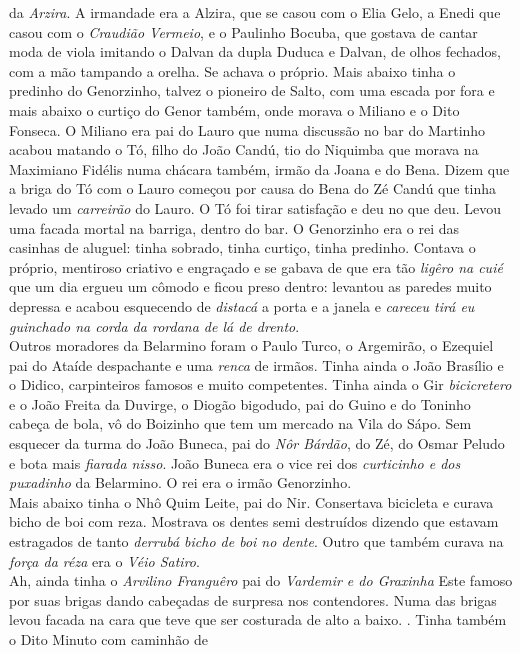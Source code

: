 \documentclass[12pt,brazil,]{book}
\begin{document}
da \emph{Arzira}. A irmandade era a Alzira, que se casou com o Elia
Gelo, a Enedi que casou com o \emph{Craudião Vermeio}, e o Paulinho
Bocuba, que gostava de cantar moda de viola imitando o Dalvan da dupla
Duduca e Dalvan, de olhos fechados, com a mão tampando a orelha. Se
achava o próprio. Mais abaixo tinha o predinho do Genorzinho, talvez o
pioneiro de Salto, com uma escada por fora e mais abaixo o curtiço do
Genor também, onde morava o Miliano e o Dito Fonseca. O Miliano era pai
do Lauro que numa discussão no bar do Martinho acabou matando o Tó,
filho do João Candú, tio do Niquimba que morava na Maximiano Fidélis
numa chácara também, irmão da Joana e do Bena. Dizem que a briga do Tó
com o Lauro começou por causa do Bena do Zé Candú que tinha levado um
\emph{carreirão} do Lauro. O Tó foi tirar satisfação e deu no que deu.
Levou uma facada mortal na barriga, dentro do bar. O Genorzinho era o
rei das casinhas de aluguel: tinha sobrado, tinha curtiço, tinha
predinho. Contava o próprio, mentiroso criativo e engraçado e se gabava
de que era tão \emph{ligêro na cuié} que um dia ergueu um cômodo e ficou
preso dentro: levantou as paredes muito depressa e acabou esquecendo de
\emph{distacá} a porta e a janela e \emph{careceu tirá eu guinchado na
corda da rordana de lá de drento}.\\
Outros moradores da Belarmino foram o Paulo Turco, o Argemirão, o
Ezequiel pai do Ataíde despachante e uma \emph{renca} de irmãos. Tinha
ainda o João Brasílio e o Didico, carpinteiros famosos e muito
competentes. Tinha ainda o Gir \emph{bicicretero} e o João Freita da
Duvirge, o Diogão bigodudo, pai do Guino e do Toninho cabeça de bola, vô
do Boizinho que tem um mercado na Vila do Sápo. Sem esquecer da turma do
João Buneca, pai do \emph{Nôr Bárdão}, do Zé, do Osmar Peludo e bota
mais \emph{fiarada nisso}. João Buneca era o vice rei dos
\emph{curticinho e dos puxadinho} da Belarmino. O rei era o irmão
Genorzinho.\\
Mais abaixo tinha o Nhô Quim Leite, pai do Nir. Consertava bicicleta e
curava bicho de boi com reza. Mostrava os dentes semi destruídos dizendo
que estavam estragados de tanto \emph{derrubá bicho de boi no dente}.
Outro que também curava na \emph{força da réza} era o \emph{Véio
Satiro}.\\
Ah, ainda tinha o \emph{Arvilino Franguêro} pai do \emph{Vardemir e do
Graxinha} Este famoso por suas brigas dando cabeçadas de surpresa nos
contendores. Numa das brigas levou facada na cara que teve que ser
costurada de alto a baixo. . Tinha também o Dito Minuto com caminhão de
\end{document}
